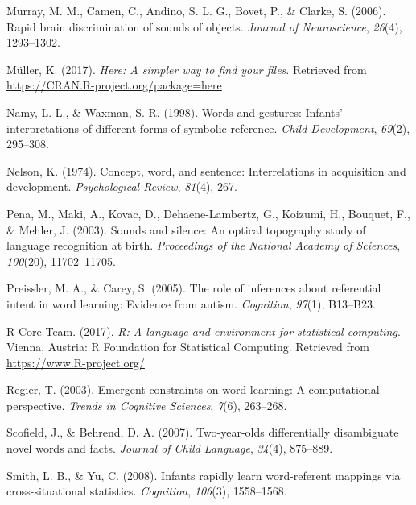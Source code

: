 \documentclass[english,floatsintext,man]{apa6}
\theoremstyle{definition}
\theoremstyle{definition}
\theoremstyle{definition}
\theoremstyle{remark}
\begin{document}
\leavevmode\hypertarget{ref-murray2006rapid}{}%
Murray, M. M., Camen, C., Andino, S. L. G., Bovet, P., \& Clarke, S.
(2006). Rapid brain discrimination of sounds of objects. \emph{Journal
of Neuroscience}, \emph{26}(4), 1293--1302.

\leavevmode\hypertarget{ref-R-here}{}%
Müller, K. (2017). \emph{Here: A simpler way to find your files}.
Retrieved from \url{https://CRAN.R-project.org/package=here}

\leavevmode\hypertarget{ref-namy1998words}{}%
Namy, L. L., \& Waxman, S. R. (1998). Words and gestures: Infants'
interpretations of different forms of symbolic reference. \emph{Child
Development}, \emph{69}(2), 295--308.

\leavevmode\hypertarget{ref-nelson1974concept}{}%
Nelson, K. (1974). Concept, word, and sentence: Interrelations in
acquisition and development. \emph{Psychological Review}, \emph{81}(4),
267.

\leavevmode\hypertarget{ref-pena2003sounds}{}%
Pena, M., Maki, A., Kovac, D., Dehaene-Lambertz, G., Koizumi, H.,
Bouquet, F., \& Mehler, J. (2003). Sounds and silence: An optical
topography study of language recognition at birth. \emph{Proceedings of
the National Academy of Sciences}, \emph{100}(20), 11702--11705.

\leavevmode\hypertarget{ref-preissler2005role}{}%
Preissler, M. A., \& Carey, S. (2005). The role of inferences about
referential intent in word learning: Evidence from autism.
\emph{Cognition}, \emph{97}(1), B13--B23.

\leavevmode\hypertarget{ref-R-base}{}%
R Core Team. (2017). \emph{R: A language and environment for statistical
computing}. Vienna, Austria: R Foundation for Statistical Computing.
Retrieved from \url{https://www.R-project.org/}

\leavevmode\hypertarget{ref-regier2003emergent}{}%
Regier, T. (2003). Emergent constraints on word-learning: A
computational perspective. \emph{Trends in Cognitive Sciences},
\emph{7}(6), 263--268.

\leavevmode\hypertarget{ref-scofield2007two}{}%
Scofield, J., \& Behrend, D. A. (2007). Two-year-olds differentially
disambiguate novel words and facts. \emph{Journal of Child Language},
\emph{34}(4), 875--889.

\leavevmode\hypertarget{ref-smith2008infants}{}%
Smith, L. B., \& Yu, C. (2008). Infants rapidly learn word-referent
mappings via cross-situational statistics. \emph{Cognition},
\emph{106}(3), 1558--1568.
\end{document}
